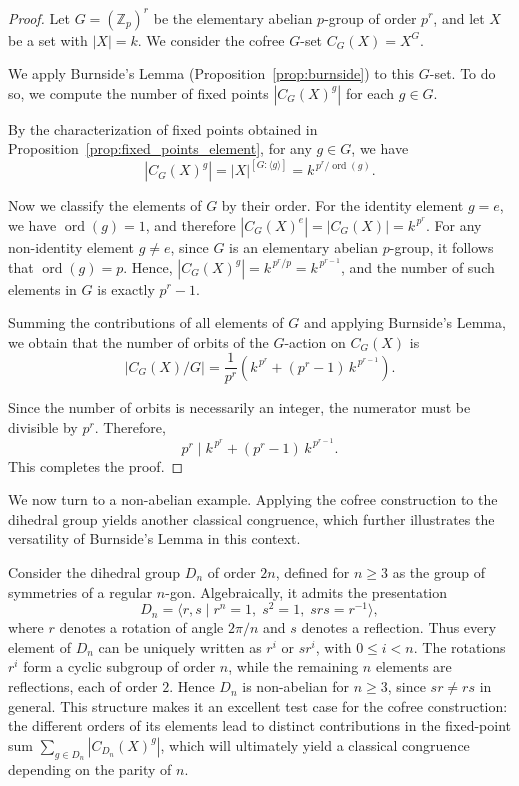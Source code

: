 \documentclass[10pt,a4paper]{amsart}
\begin{document}
\begin{proof}
Let $G = (\mathbb{Z}_p)^r$ be the elementary abelian $p$-group of order $p^r$, and let $X$ be a set with $|X| = k$. We consider the cofree $G$-set $C_G(X) = X^G$.

We apply Burnside's Lemma (Proposition~\ref{prop:burnside}) to this $G$-set. To do so, we compute the number of fixed points $|C_G(X)^g|$ for each $g \in G$.

By the characterization of fixed points obtained in Proposition~\ref{prop:fixed_points_element}, for any $g \in G$, we have
\[
\left\lvert C_G(X)^g \right\rvert = |X|^{[G : \langle g \rangle]} = k^{\, p^r / \operatorname{ord}(g)}.
\]

Now we classify the elements of $G$ by their order. For the identity element $g=e$, we have $\operatorname{ord}(g)=1$, and therefore $\left\lvert C_G(X)^e \right\rvert = |C_G(X)| = k^{\,p^r}$. For any non-identity element $g \neq e$, since $G$ is an elementary abelian $p$-group, it follows that $\operatorname{ord}(g)=p$. Hence, $\left\lvert C_G(X)^g \right\rvert = k^{\, p^r / p} = k^{\,p^{r-1}}$, and the number of such elements in $G$ is exactly $p^r - 1$.

Summing the contributions of all elements of $G$ and applying Burnside's Lemma, we obtain that the number of orbits of the $G$-action on $C_G(X)$ is
\[
\left\lvert C_G(X) / G \right\rvert
= \frac{1}{p^r}
\left( k^{\,p^r} + (p^r - 1)\, k^{\,p^{r-1}} \right).
\]

Since the number of orbits is necessarily an integer, the numerator must be divisible by $p^r$. Therefore,
\[
p^r \mid k^{\,p^r} + (p^r - 1)\, k^{\,p^{r-1}}.
\]
This completes the proof.
\end{proof}

We now turn to a non-abelian example. Applying the cofree construction to the dihedral group yields another classical congruence, which further illustrates the versatility of Burnside's Lemma in this context.

Consider the dihedral group $D_n$ of order $2n$, defined for $n \geq 3$ as the group of symmetries of a regular $n$-gon. Algebraically, it admits the presentation
\[
D_n = \langle r, s \mid r^n = 1,\; s^2 = 1,\; srs = r^{-1} \rangle,
\]
where $r$ denotes a rotation of angle $2\pi/n$ and $s$ denotes a reflection. Thus every element of $D_n$ can be uniquely written as $r^i$ or $sr^i$, with $0 \leq i < n$. The rotations $r^i$ form a cyclic subgroup of order $n$, while the remaining $n$ elements are reflections, each of order $2$. Hence $D_n$ is non-abelian for $n \geq 3$, since $sr \neq rs$ in general. This structure makes it an excellent test case for the cofree construction: the different orders of its elements lead to distinct contributions in the fixed-point sum $\sum_{g \in D_n} |C_{D_n}(X)^g|$, which will ultimately yield a classical congruence depending on the parity of $n$.
\end{document}
